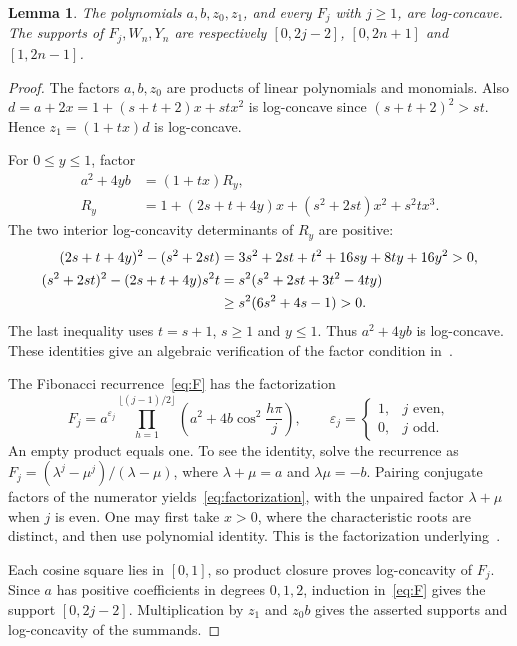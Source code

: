\documentclass[11pt]{article}
\newtheorem{lemma}[theorem]{Lemma}
\begin{document}
\begin{lemma}\label{lem:lc}
The polynomials $a,b,z_0,z_1$, and every $F_j$ with $j\geq1$, are
log-concave. The supports of $F_j,W_n,Y_n$ are respectively
$[0,2j-2]$, $[0,2n+1]$ and $[1,2n-1]$.
\end{lemma}
\begin{proof}
The factors $a,b,z_0$ are products of linear polynomials and monomials.
Also $d=a+2x=1+(s+t+2)x+stx^2$ is log-concave since
$(s+t+2)^2>st$. Hence $z_1=(1+tx)d$ is log-concave.

For $0\leq y\leq1$, factor
\begin{equation}\label{eq:cubic}
 \begin{aligned}
 a^2+4yb&=(1+tx)R_y,\\
 R_y&=1+(2s+t+4y)x+(s^2+2st)x^2+s^2tx^3.
 \end{aligned}
\end{equation}
The two interior log-concavity determinants of $R_y$ are positive:
\begin{align}
 (2s+t+4y)^2-(s^2+2st)
   &=3s^2+2st+t^2+16sy+8ty+16y^2>0,\label{eq:det1}\\
 (s^2+2st)^2-(2s+t+4y)s^2t
   &=s^2(s^2+2st+3t^2-4ty)\notag\\
   &\geq s^2(6s^2+4s-1)>0.\label{eq:det2}
\end{align}
The last inequality uses $t=s+1$, $s\geq1$ and $y\leq1$.
Thus $a^2+4yb$ is log-concave. These identities give an algebraic
verification of the factor condition in~\cite[Section 2.5]{GS}.

The Fibonacci recurrence~\eqref{eq:F} has the factorization
\begin{equation}\label{eq:factorization}
 F_j=a^{\varepsilon_j}
 \prod_{h=1}^{\lfloor(j-1)/2\rfloor}
 \left(a^2+4b\cos^2\frac{h\pi}{j}\right),
 \qquad
 \varepsilon_j=\begin{cases}1,&j\text{ even},\\0,&j\text{ odd}.
 \end{cases}
\end{equation}
An empty product equals one. To see the identity, solve the recurrence as
$F_j=(\lambda^j-\mu^j)/(\lambda-\mu)$, where
$\lambda+\mu=a$ and $\lambda\mu=-b$. Pairing conjugate factors of the
numerator yields~\eqref{eq:factorization}, with the unpaired factor
$\lambda+\mu$ when $j$ is even. One may first take $x>0$, where the
characteristic roots are distinct, and then use polynomial identity.
This is the factorization underlying~\cite[equations (29)--(30)]{GS}.

Each cosine square lies in $[0,1]$, so product closure proves
log-concavity of $F_j$. Since $a$ has positive coefficients in degrees
$0,1,2$, induction in~\eqref{eq:F} gives the support $[0,2j-2]$.
Multiplication by $z_1$ and $z_0b$ gives the asserted supports and
log-concavity of the summands.
\end{proof}
\end{document}
